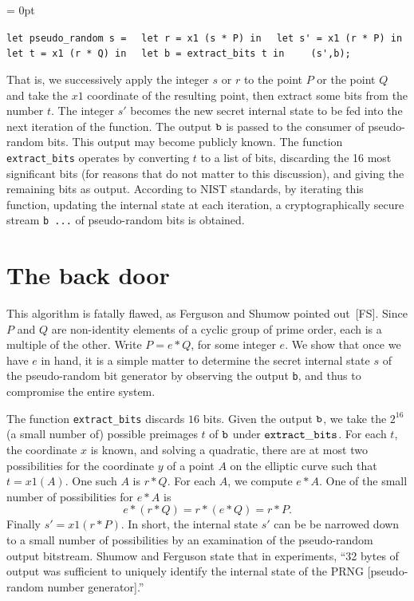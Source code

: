 \documentclass[11pt]{amsart} %
\begin{document}
\smallskip
{
\parskip = 0pt

\obeylines

\verb!let pseudo_random s =!
\verb!  let r = x1 (s * P) in!
\verb!  let s' = x1 (r * P) in!
\verb!  let t = x1 (r * Q) in!
\verb!  let b = extract_bits t in!
\verb!    (s',b);!

}

That is, we successively apply the integer $s$ or $r$ to the point $P$ or the point $Q$ and take the $x1$ coordinate of the resulting point,
then extract some bits from the number $t$.
The integer $s' $ becomes the new secret internal state to be fed into the next
iteration of the function.  The output ${\tt b}$ is passed to the consumer of pseudo-random bits.
This output may become publicly known.
The function {\tt extract\_bits} operates by converting $t$ to a list of bits, discarding
the 16 most significant bits (for reasons that do not matter to this discussion),
and giving the remaining bits as output.  According to NIST standards, by iterating this function,
updating the internal state at each iteration, a cryptographically secure stream {\tt b ...} 
of pseudo-random bits is obtained.

\section{The back door}

This algorithm is fatally flawed, as Ferguson and Shumow pointed out~[FS].
Since $P$ and $Q$ are non-identity elements of a cyclic group of prime order, each is a multiple of the other.
Write $P = e * Q$, for some integer $e$.   We show that once we have $e$ in hand, it is a simple
matter to determine the secret internal state $s$ of the pseudo-random bit generator by observing the output {\tt b},
and thus to compromise the entire system.

The function {\tt extract\_bits} discards $16$ bits.  Given the output ${\tt b}$, 
we take the $2^{16}$ (a small number of) possible preimages $t$ of ${\tt b}$ under ${\tt extract\_bits}$.
For each $t$, the coordinate $x$ is known, and solving a quadratic,
there are at most two possibilities for the coordinate $y$ of a point $A$ on the elliptic curve
such that $t = x1 (A)$.  One such $A$ is $r * Q$.  For each $A$, we compute $e * A$.    
One of the small number of possibilities for 
$e * A$ is 
\begin{equation}\label{eqn:diffie-hellman}
e * (r * Q) = r * (e * Q) = r * P.
\end{equation}
Finally $s' = x1 (r * P)$.  In short, the internal state $s'$ can be be narrowed down to a small number
of possibilities by an examination of the pseudo-random output bitstream.  Shumow and Ferguson
state that in experiments, ``32 bytes of output was sufficient to uniquely identify the internal
state of the PRNG [pseudo-random number generator].''
\end{document}

